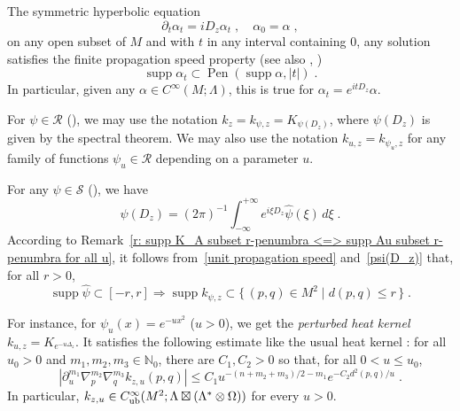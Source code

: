 \documentclass{memo-l}
\theoremstyle{plain}
\theoremstyle{definition}
\theoremstyle{remark}
\newcommand{\N}{\mathbb{N}}
\newcommand{\RR}{\mathcal{R}}
\renewcommand{\SS}{\mathcal{S}}
\newcommand{\supp}{\operatorname{supp}}
\newcommand{\Pen}{\operatorname{Pen}}
\newcommand{\Cinftyub}{C^\infty_{\text{\rm ub}}}
\numberwithin{section}{chapter}
\numberwithin{equation}{section}%
\begin{document}
The symmetric hyperbolic equation
\begin{equation}\label{wave}
\partial_t\alpha_t=iD_z\alpha_t\;,\quad\alpha_0=\alpha\;,
\end{equation}
on any open subset of $M$ and with $t$ in any interval containing $0$, any solution satisfies the finite propagation speed property \cite[Proof of Proposition~1.1]{Chernoff1973} (see also \cite[Theorem~1.4]{CheegerGromovTaylor1982}, \cite[Proof of Proposition~7.20]{Roe1998})
\begin{equation}\label{unit propagation speed}
\supp\alpha_t\subset\Pen(\supp\alpha,|t|)\;.
\end{equation}
In particular, given any $\alpha\in C^\infty(M;\Lambda)$, this is true for $\alpha_t=e^{itD_z}\alpha$.

For $\psi\in\RR$ (), we may use the notation $k_z=k_{\psi,z}=K_{\psi(D_z)}$, where $\psi(D_z)$ is given by the spectral theorem. We may also use the notation $k_{u,z}=k_{\psi_u,z}$ for any family of functions $\psi_u\in\RR$ depending on a parameter $u$.  

For any $\psi\in\SS$ (), we have \cite[Proof of Theorem~5.5]{Roe1988I}
\begin{equation}\label{psi(D_z)}
\psi(D_z)=(2\pi)^{-1}\int_{-\infty}^{+\infty} e^{i\xi D_z}\hat\psi(\xi)\,d\xi\;.
\end{equation}
According to Remark~\ref{r: supp K_A subset r-penumbra <=> supp Au subset r-penumbra for all u}, it follows from~\eqref{unit propagation speed} and~\eqref{psi(D_z)} that, for all $r>0$,
\begin{equation}\label{supp hat psi subset [-R R] => supp K_psi(D_z) subset ...}
\supp\hat\psi\subset[-r,r]\Rightarrow\supp k_{\psi,z}\subset\{\,(p,q)\in M^2\mid d(p,q)\le r\,\}\;.
\end{equation}


For instance, for $\psi_u(x)=e^{-ux^2}$ ($u>0$), we get the \emph{perturbed heat kernel} $k_{u,z}=K_{e^{-u\Delta_z}}$. It satisfies the following estimate like the usual heat kernel \cite{ButtigEichhorn1991}: for all $u_0>0$ and $m_1,m_2,m_3\in\N_0$, there are $C_1,C_2>0$ so that, for all $0<u\le u_0$, 
\begin{equation}\label{heat kernel estimates}
|\partial_u^{m_1}\nabla_p^{m_2}\nabla_q^{m_3}k_{z,u}(p,q)|\le C_1u^{-(n+m_2+m_3)/2-m_1}e^{-C_2d^2(p,q)/u}\;.
\end{equation}
In particular, $k_{z,u}\in\Cinftyub(M^2;\Lambda\boxtimes(\Lambda^*\otimes\Omega))$ for every $u>0$.
\end{document}
